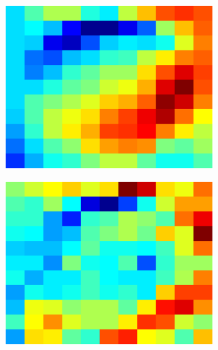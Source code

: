 \documentclass {udthesis}
\begin{document}
\begin{figure}
  \centering
  \begin{subfigure}[]{0.3\textwidth}
      \includegraphics[width=\textwidth]{curr_scallop_mean}
      \caption{}
      \label{subfig:mean_scallop}
  \end{subfigure}
  \begin{subfigure}[]{0.3\textwidth}
      \includegraphics[width=\textwidth]{curr_scallop_stddev}
      \caption{}
      \label{subfig:stddev_scallop}
  \end{subfigure}
  \begin{subfigure}[]{0.3\textwidth}

\end{subfigure}
\end{figure}
\end{document}

